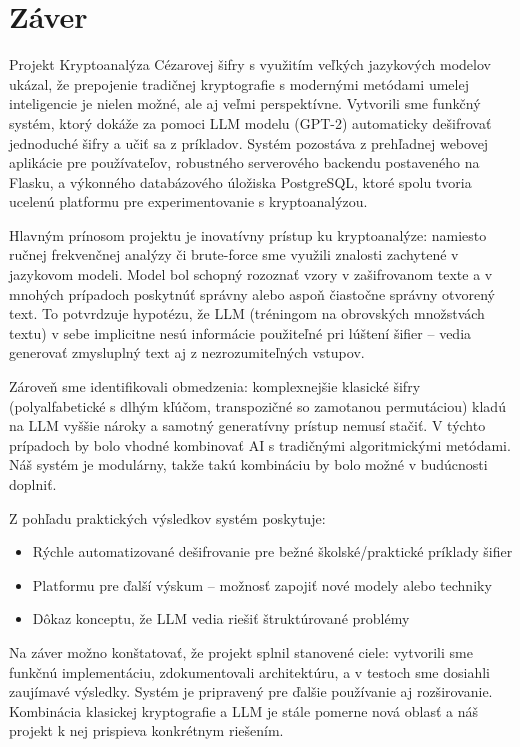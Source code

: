 \documentclass[12pt,a4paper]{article}
\begin{document}
\section{Záver}
Projekt Kryptoanalýza Cézarovej šifry s využitím veľkých jazykových modelov ukázal, že prepojenie tradičnej kryptografie s modernými metódami umelej inteligencie je nielen možné, ale aj veľmi perspektívne. Vytvorili sme funkčný systém, ktorý dokáže za pomoci LLM modelu (GPT-2) automaticky dešifrovať jednoduché šifry a učiť sa z príkladov. Systém pozostáva z prehľadnej webovej aplikácie pre používateľov, robustného serverového backendu postaveného na Flasku, a výkonného databázového úložiska PostgreSQL, ktoré spolu tvoria ucelenú platformu pre experimentovanie s kryptoanalýzou.

Hlavným prínosom projektu je inovatívny prístup ku kryptoanalýze: namiesto ručnej frekvenčnej analýzy či brute-force sme využili znalosti zachytené v jazykovom modeli. Model bol schopný rozoznať vzory v zašifrovanom texte a v mnohých prípadoch poskytnúť správny alebo aspoň čiastočne správny otvorený text. To potvrdzuje hypotézu, že LLM (tréningom na obrovských množstvách textu) v sebe implicitne nesú informácie použiteľné pri lúštení šifier -- vedia generovať zmysluplný text aj z nezrozumiteľných vstupov.

Zároveň sme identifikovali obmedzenia: komplexnejšie klasické šifry (polyalfabetické s dlhým kľúčom, transpozičné so zamotanou permutáciou) kladú na LLM vyššie nároky a samotný generatívny prístup nemusí stačiť. V týchto prípadoch by bolo vhodné kombinovať AI s tradičnými algoritmickými metódami. Náš systém je modulárny, takže takú kombináciu by bolo možné v budúcnosti doplniť.

Z pohľadu praktických výsledkov systém poskytuje:
\begin{itemize}
    \item Rýchle automatizované dešifrovanie pre bežné školské/praktické príklady šifier
    \item Platformu pre ďalší výskum -- možnosť zapojiť nové modely alebo techniky
    \item Dôkaz konceptu, že LLM vedia riešiť štruktúrované problémy
\end{itemize}

Na záver možno konštatovať, že projekt splnil stanovené ciele: vytvorili sme funkčnú implementáciu, zdokumentovali architektúru, a v testoch sme dosiahli zaujímavé výsledky. Systém je pripravený pre ďalšie používanie aj rozširovanie. Kombinácia klasickej kryptografie a LLM je stále pomerne nová oblasť a náš projekt k nej prispieva konkrétnym riešením.
\end{document}
